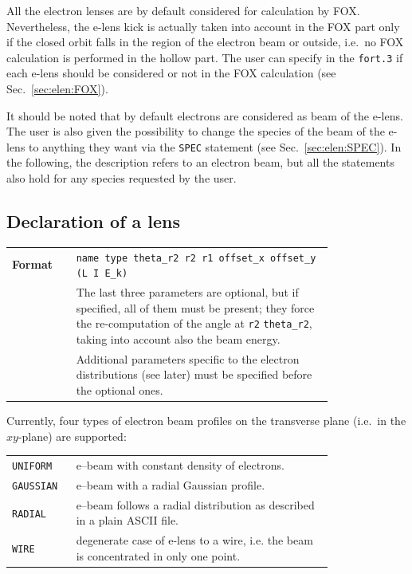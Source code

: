 \bigskip
\noindent All the electron lenses are by default considered for calculation by FOX. Nevertheless, the e-lens kick is actually taken into account in the FOX part only if the closed orbit falls in the region of the electron beam or outside, i.e.~no FOX calculation is performed in the hollow part. The user can specify in the \texttt{fort.3} if each e-lens should be considered or not in the FOX calculation (see Sec.~\ref{sec:elen:FOX}).

\noindent It should be noted that by default electrons are considered as beam of the e-lens.
The user is also given the possibility to change the species of the beam of the e-lens to anything they want via the \texttt{SPEC} statement (see Sec.~\ref{sec:elen:SPEC}).
In the following, the description refers to an electron beam, but all the statements also hold for any species requested by the user.

\subsection{Declaration of a lens}\label{sec:elen:declaration}
\begin{tabular}{@{}lp{0.8\linewidth}}
    \textbf{Format}     & \texttt{name type theta\_r2 r2 r1 offset\_x offset\_y (L I E\_k) } \\
    & The last three parameters are optional, but if specified, all of them must be present; they force the re-computation of the angle at \texttt{r2} \texttt{theta\_r2}, taking into account also the beam energy.  \\
    & Additional parameters specific to the electron distributions (see later) must be specified before the optional ones. \\
\end{tabular}

\bigskip
\noindent Currently, four types of electron beam profiles on the transverse plane (i.e.~in the $xy$-plane) are supported:

\bigskip
\begin{tabular}{@{}lp{0.8\linewidth}}
    \texttt{UNIFORM}  & e--beam with constant density of electrons. \\
    \texttt{GAUSSIAN} & e--beam with a radial Gaussian profile. \\
    \texttt{RADIAL}   & e--beam follows a radial distribution as described in a plain ASCII file. \\
    \texttt{WIRE}     & degenerate case of e-lens to a wire, i.e. the beam is concentrated in only one point. \\
\end{tabular}

